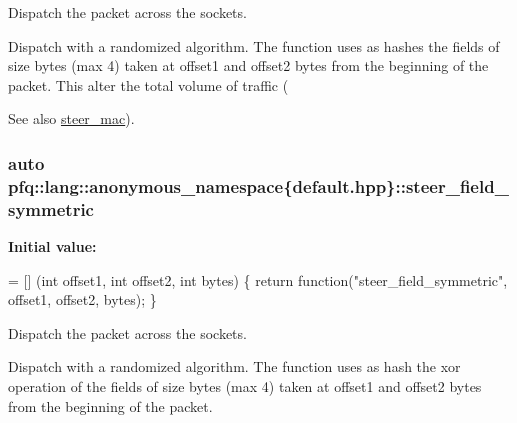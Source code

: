 Dispatch the packet across the sockets. 

Dispatch with a randomized algorithm. The function uses as hashes the fields of {\ttfamily size} bytes (max 4) taken at {\ttfamily offset1} and {\ttfamily offset2} bytes from the beginning of the packet. This alter the total volume of traffic (\begin{DoxySeeAlso}{See also}
\hyperlink{namespacepfq_1_1lang_1_1anonymous__namespace_02default_8hpp_03_ad51e91e3b485c729ac1ba39a46e337a0}{steer\+\_\+mac}). 
\end{DoxySeeAlso}
\subsubsection[{\texorpdfstring{steer\+\_\+field\+\_\+symmetric}{steer_field_symmetric}}]{\setlength{\rightskip}{0pt plus 5cm}auto pfq\+::lang\+::anonymous\+\_\+namespace\{default.\+hpp\}\+::steer\+\_\+field\+\_\+symmetric}\hypertarget{namespacepfq_1_1lang_1_1anonymous__namespace_02default_8hpp_03_a422c7bafe8240549d193903890f9ec48}{}\label{namespacepfq_1_1lang_1_1anonymous__namespace_02default_8hpp_03_a422c7bafe8240549d193903890f9ec48}
{\bfseries Initial value\+:}
\begin{DoxyCode}
= [] (\textcolor{keywordtype}{int} offset1, \textcolor{keywordtype}{int} offset2, \textcolor{keywordtype}{int} bytes) \{
                                \textcolor{keywordflow}{return} \textcolor{keyword}{function}(\textcolor{stringliteral}{"steer\_field\_symmetric"}, offset1, offset2, bytes);
                           \}
\end{DoxyCode}


Dispatch the packet across the sockets. 

Dispatch with a randomized algorithm. The function uses as {\ttfamily hash} the xor operation of the fields of {\ttfamily size} bytes (max 4) taken at {\ttfamily offset1} and {\ttfamily offset2} bytes from the beginning of the packet. 
